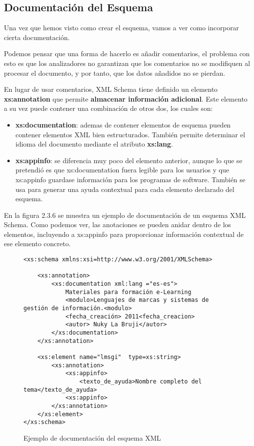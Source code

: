 \subsection{Documentación del Esquema}
Una vez que hemos visto como crear el esquema, vamos a ver como incorporar cierta documentación.

Podemos pensar que una forma de hacerlo es añadir comentarios, el problema con esto es que los analizadores no garantizan que los comentarios no se modifiquen al procesar el documento, y por tanto, que los datos añadidos no se pierdan.

En lugar de usar comentarios, XML Schema tiene definido un elemento \textbf{xs:annotation} que permite \textbf{almacenar información adicional}. Este elemento a su vez puede contener una combinación de otros dos, los cuales son:

\begin{itemize}
    \item \textbf{xs:documentation}: ademas de contener elementos de esquema pueden contener elementos XML bien estructurados. También permite determinar el idioma del documento mediante el atributo \textbf{xs:lang}.

    \item \textbf{xs:appinfo}: se diferencia muy poco del elemento anterior, aunque lo que se pretendió es que xs:documentation fuera legible para los usuarios y que xs:appinfo guardase información para los programas de software. También se usa para generar una ayuda contextual para cada elemento declarado del esquema.
\end{itemize}

En la figura 2.3.6 se muestra un ejemplo de documentación de un esquema XML Schema. Como podemos ver, las anotaciones se pueden anidar dentro de los elementos, incluyendo a xs:appinfo para proporcionar información contextual de ese elemento concreto.

\begin{figure}[H]
    \begin{tcolorbox}[sharp corners, colback=yellow!30, colframe=white!20]
        \scriptsize
        \begin{verbatim}
<xs:schema xmlns:xsi=http://www.w3.org/2001/XMLSchema>

    <xs:annotation>
        <xs:documentation xml:lang ="es-es">
            Materiales para formación e-Learning
            <modulo>Lenguajes de marcas y sistemas de gestión de información.<modulo>
            <fecha_creación> 2011<fecha_creacion>
            <autor> Nuky La Bruji</autor>
        </xs:documentation>
    </xs:annotation>

    <xs:element name="lmsgi"  type=xs:string>
        <xs:annotation>
            <xs:appinfo>
                <texto_de_ayuda>Nombre completo del tema</texto_de_ayuda>
            <xs:appinfo>
        </xs:annotation>
    </xs:element>
</xs:schema>
        \end{verbatim}
    \end{tcolorbox}
    \caption{Ejemplo de documentación del esquema XML}
\end{figure}

